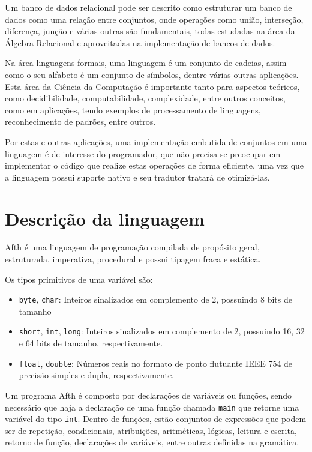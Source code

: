 \documentclass[
	article,			%
	11pt,				%
	oneside,			%
	a4paper,			%
	english,			%
	brazil,				%
	sumario=tradicional
	]{abntex2}
\begin{document}
Um banco de dados relacional pode ser descrito como estruturar um banco de dados
como uma relação entre conjuntos, onde operações como união, interseção, diferença,
junção e várias outras são fundamentais, todas estudadas na área da Álgebra Relacional
e aproveitadas na implementação de bancos de dados.

Na área linguagens formais, uma linguagem é um conjunto de cadeias, assim como o
seu alfabeto é um conjunto de símbolos, dentre várias outras aplicações. Esta área
da Ciência da Computação é importante tanto para aspectos teóricos, como decidibilidade,
computabilidade, complexidade, entre outros conceitos, como em aplicações, tendo exemplos
de processamento de linguagens, reconhecimento de padrões, entre outros.

Por estas e outras aplicações, uma implementação embutida de conjuntos em uma linguagem
é de interesse do programador, que não precisa se preocupar em implementar o código
que realize estas operações de forma eficiente, uma vez que a linguagem possui
suporte nativo e seu tradutor tratará de otimizá-las.

\section{Descrição da linguagem}
\label{desc}

Afth é uma linguagem de programação compilada de propósito geral, estruturada, imperativa,
procedural e possui tipagem fraca e estática.

Os tipos primitivos de uma variável são:

\begin{itemize}
	\item \texttt{byte}, \texttt{char}: Inteiros sinalizados em
	      complemento de 2, possuindo 8 bits de tamanho
	\item \texttt{short}, \texttt{int}, \texttt{long}: Inteiros sinalizados em
	      complemento de 2, possuindo 16, 32 e 64 bits de tamanho, respectivamente.
	\item \texttt{float}, \texttt{double}: Números reais no formato de ponto
	      flutuante IEEE 754 de precisão simples e dupla, respectivamente.
\end{itemize}

Um programa Afth é composto por declarações de variáveis ou funções, sendo necessário
que haja a declaração de uma função chamada \texttt{main} que retorne uma variável do tipo
\texttt{int}. Dentro de funções, estão conjuntos de expressões que podem ser de repetição,
condicionais, atribuições, aritméticas, lógicas, leitura e escrita, retorno de função,
declarações de variáveis, entre outras definidas na gramática.
\end{document}
